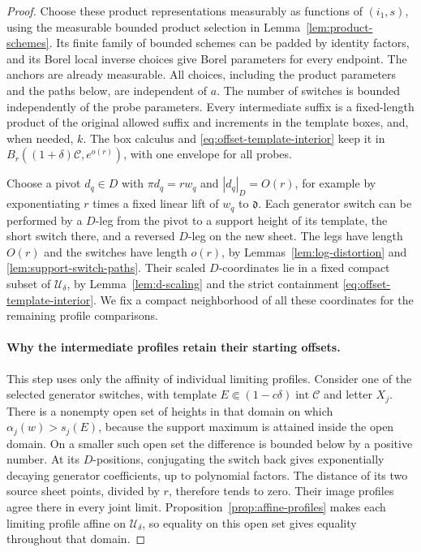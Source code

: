 \begin{proof}
Choose these product representations measurably as functions of
$(i_1,s)$, using the measurable bounded product selection in
Lemma~\ref{lem:product-schemes}.  Its finite family of bounded schemes can
be padded by identity factors, and its Borel local inverse choices give
Borel parameters for every endpoint.  The anchors are already measurable.
All choices, including the product parameters and the paths below, are
independent of $a$.  The number of switches is bounded independently of
the probe parameters.  Every intermediate suffix is a fixed-length
product of the original allowed suffix and increments in the template
boxes, and, when needed, $k$.  The box calculus and
\eqref{eq:offset-template-interior} keep it in
$B_r((1+\delta)\mathcal C,e^{o(r)})$, with one envelope for all probes.

Choose a pivot $d_q\in D$ with $\pi d_q=rw_q$ and $|d_q|_D=O(r)$, for
example by exponentiating $r$ times a fixed linear lift of $w_q$ to
$\mathfrak d$.  Each generator switch can be performed by a $D$-leg from
the pivot to a support height of its template, the short switch there,
and a reversed $D$-leg on the new sheet.  The legs have length $O(r)$ and
the switches have length $o(r)$, by Lemmas~\ref{lem:log-distortion} and
\ref{lem:support-switch-paths}.  Their scaled $D$-coordinates lie in a fixed
compact subset of $\mathcal U_\delta$, by
Lemma~\ref{lem:d-scaling} and the strict containment
\eqref{eq:offset-template-interior}.  We fix a compact neighborhood of all
these coordinates for the remaining profile comparisons.

\paragraph{Why the intermediate profiles retain their starting offsets.}
This step uses only the affinity of individual limiting profiles.
Consider one of the selected generator switches, with template
$E\Subset(1-c\delta)\operatorname{int}\mathcal C$ and letter $X_j$.
There is a nonempty open set of heights in that domain on which
$\alpha_j(w)>s_j(E)$, because the support maximum is attained inside the
open domain.  On a smaller such open set the difference is bounded below
by a positive number.  At its $D$-positions, conjugating the switch back
gives exponentially decaying generator coefficients, up to polynomial
factors.  The distance of its two source sheet points, divided by $r$,
therefore tends to zero.  Their image profiles agree there in every
joint limit.  Proposition~\ref{prop:affine-profiles} makes each limiting
profile affine on $\mathcal U_\delta$, so equality on this open set gives
equality throughout that domain.


\end{proof}
